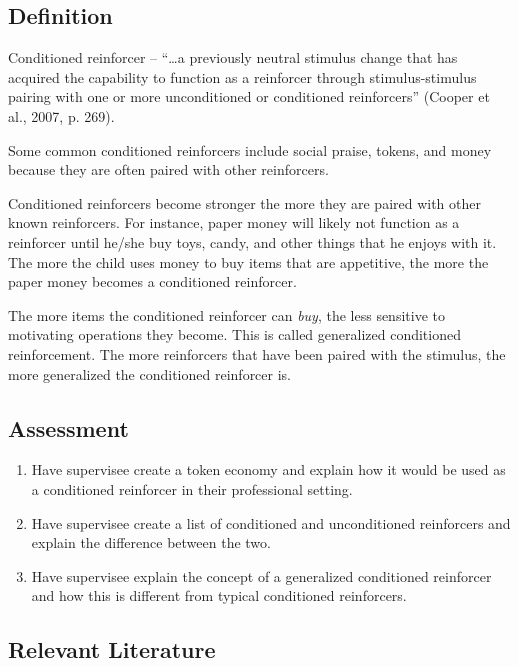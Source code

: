 \subsection{Definition}
Conditioned reinforcer – ``…a previously neutral stimulus change that has acquired the capability to function as a reinforcer through stimulus-stimulus pairing with one or more unconditioned or conditioned reinforcers'' (Cooper et al., 2007, p. 269).

Some common conditioned reinforcers include social praise, tokens, and money because they are often paired with other reinforcers. 

Conditioned reinforcers become stronger the more they are paired with other known reinforcers. For instance, paper money will likely not function as a reinforcer until he/she buy toys, candy, and other things that he enjoys with it. The more the child uses money to buy items that are appetitive, the more the paper money becomes a conditioned reinforcer.

The more items the conditioned reinforcer can \textit{buy}, the less sensitive to motivating operations they become. This is called generalized conditioned reinforcement. The more reinforcers that have been paired with the stimulus, the more generalized the conditioned reinforcer is.
%
\subsection{Assessment}
\begin{enumerate}
\item Have supervisee create a token economy and explain how it would be used as a conditioned reinforcer in their professional setting. 
\item Have supervisee create a list of conditioned and unconditioned reinforcers and explain the difference between the two. 
\item Have supervisee explain the concept of a generalized conditioned reinforcer and how this is different from typical conditioned reinforcers.
%
\end{enumerate}
%
\subsection{Relevant Literature}
\begin{refsection}
\nocite{test,alang2017police,clayton2018black}
\printbibliography[heading=none]
\end{refsection}
%
